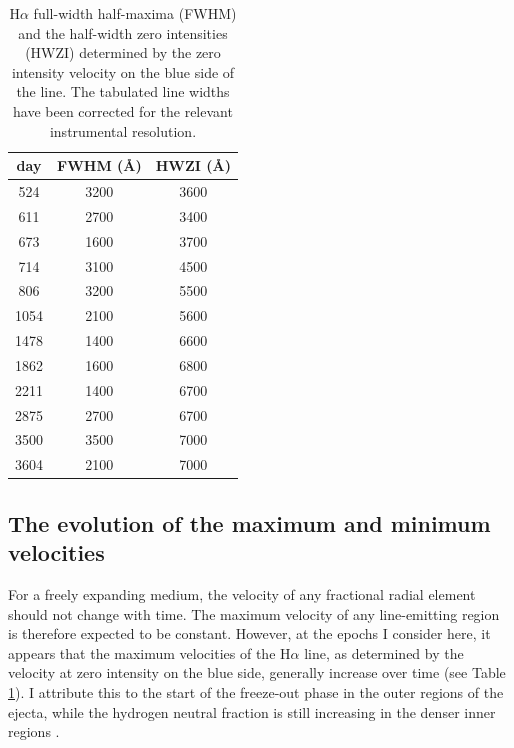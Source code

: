 \begin{table}
\centering
\caption{H$\alpha$ full-width half-maxima (FWHM) and the half-width zero 
intensities (HWZI) determined by the zero intensity velocity on the 
blue side of the line.  The tabulated line widths have been corrected for the relevant instrumental resolution.}
\begin{tabular}{c cc}
day & FWHM (\AA) & HWZI (\AA) \\
\hline
524 & 3200 & 3600 \\
611 & 2700 & 3400 \\
673 & 1600 & 3700 \\
714 & 3100 & 4500 \\
806 & 3200 & 5500 \\
1054 & 2100 & 5600 \\
1478 & 1400 & 6600 \\
1862 & 1600 & 6800 \\
2211 & 1400 & 6700 \\
2875 & 2700 & 6700 \\
3500 & 3500 & 7000 \\
3604 & 2100 & 7000

\end{tabular}

\label{FWHM}
\end{table}%

\subsection{The evolution of the maximum and minimum velocities}

For a freely expanding medium, the velocity of any fractional radial 
element should not change with time.  The maximum velocity of any 
line-emitting region is therefore expected to be constant.  However, at 
the epochs I consider here, it appears that the maximum velocities of the 
H$\alpha$ line, as determined by the velocity at zero intensity on the 
blue side, generally increase over time (see Table \ref{FWHM}).  I 
attribute this to the start of the freeze-out phase in the outer regions 
of the ejecta, while the hydrogen neutral fraction is still increasing in 
the denser inner regions \citep{Danziger1991,Fransson1993}.

